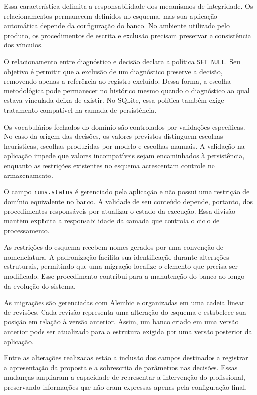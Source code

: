 Essa característica delimita a responsabilidade dos mecanismos de integridade. Os relacionamentos permanecem definidos no esquema, mas sua aplicação automática depende da configuração do banco. No ambiente utilizado pelo produto, os procedimentos de escrita e exclusão precisam preservar a consistência dos vínculos.

O relacionamento entre diagnóstico e decisão declara a política \texttt{SET NULL}. Seu objetivo é permitir que a exclusão de um diagnóstico preserve a decisão, removendo apenas a referência ao registro excluído. Dessa forma, a escolha metodológica pode permanecer no histórico mesmo quando o diagnóstico ao qual estava vinculada deixa de existir. No SQLite, essa política também exige tratamento compatível na camada de persistência.

Os vocabulários fechados do domínio são controlados por validações específicas. No caso da origem das decisões, os valores previstos distinguem escolhas heurísticas, escolhas produzidas por modelo e escolhas manuais. A validação na aplicação impede que valores incompatíveis sejam encaminhados à persistência, enquanto as restrições existentes no esquema acrescentam controle no armazenamento.

O campo \texttt{runs.status} é gerenciado pela aplicação e não possui uma restrição de domínio equivalente no banco. A validade de seu conteúdo depende, portanto, dos procedimentos responsáveis por atualizar o estado da execução. Essa divisão mantém explícita a responsabilidade da camada que controla o ciclo de processamento.

As restrições do esquema recebem nomes gerados por uma convenção de nomenclatura. A padronização facilita sua identificação durante alterações estruturais, permitindo que uma migração localize o elemento que precisa ser modificado. Esse procedimento contribui para a manutenção do banco ao longo da evolução do sistema.

As migrações são gerenciadas com Alembic e organizadas em uma cadeia linear de revisões. Cada revisão representa uma alteração do esquema e estabelece sua posição em relação à versão anterior. Assim, um banco criado em uma versão anterior pode ser atualizado para a estrutura exigida por uma versão posterior da aplicação.

Entre as alterações realizadas estão a inclusão dos campos destinados a registrar a apresentação da proposta e a sobrescrita de parâmetros nas decisões. Essas mudanças ampliaram a capacidade de representar a intervenção do profissional, preservando informações que não eram expressas apenas pela configuração final.

